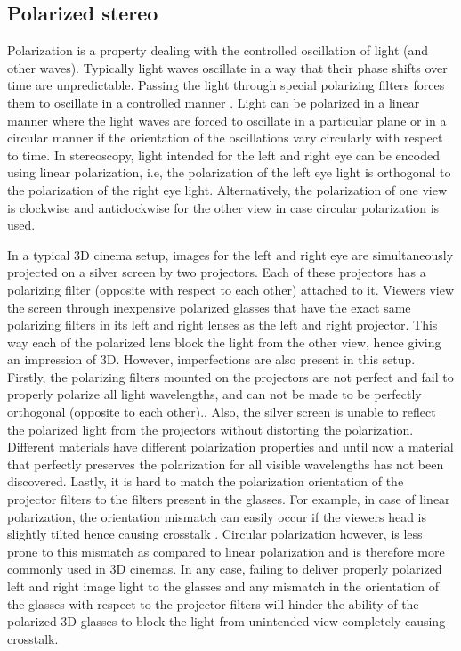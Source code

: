 \subsection{Polarized stereo}
Polarization is a property dealing with the controlled oscillation of light (and other waves). Typically light waves oscillate in a way that their phase shifts over time are unpredictable. Passing the light through special polarizing filters forces them to oscillate in a controlled manner \cite{ wiki:polarizationwiki}. Light can be polarized in a linear manner where the light waves are forced to oscillate in a particular plane or in a circular manner if the orientation of the oscillations vary circularly with respect to time. In stereoscopy, light intended for the left and right eye can be encoded using linear polarization, i.e, the polarization of the left eye light is orthogonal to the polarization of the right eye light. Alternatively, the polarization of one view is clockwise and anticlockwise for the other view in case circular polarization is used.

In a typical 3D cinema setup, images for the left and right eye are simultaneously projected on a silver screen by two projectors. Each of these projectors has a polarizing filter (opposite with respect to each other) attached to it. Viewers view the screen through inexpensive polarized glasses that have the exact same polarizing filters in its left and right lenses as the left and right projector. This way each of the polarized lens block the light from the other view, hence giving an impression of 3D. However, imperfections are also present in this setup. Firstly, the polarizing filters mounted on the projectors are not perfect and fail to properly polarize all light wavelengths, and can not be made to be perfectly orthogonal (opposite to each other).\cite{woods2012crosstalk}. Also, the silver screen is unable to reflect the polarized light from the projectors without distorting the polarization. Different materials have different polarization properties and until now a material that perfectly preserves the polarization for all visible wavelengths has not been discovered. Lastly, it is hard to match the polarization orientation of the projector filters to the filters present in the glasses. For example, in case of linear polarization, the orientation mismatch can easily occur if the viewers head is slightly tilted hence causing crosstalk \cite{hong2010analysis}. Circular polarization however, is less prone to this mismatch as compared to linear polarization and is therefore more commonly used in 3D cinemas. In any case, failing to deliver properly polarized left and right image light to the glasses and any mismatch in the orientation of the glasses with respect to the projector filters will hinder the ability of the polarized 3D glasses to block the light from unintended view completely causing crosstalk.

